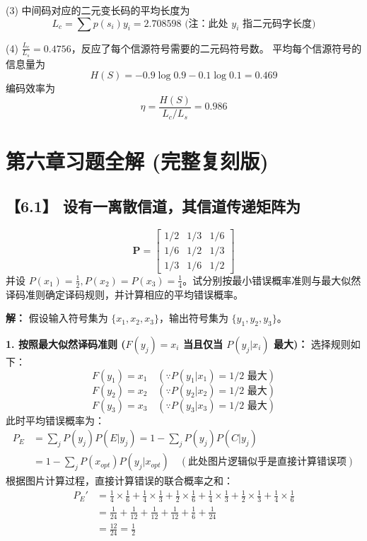 \documentclass[11pt, a4paper]{article}
\begin{document}
(3) 中间码对应的二元变长码的平均长度为
\[ L_c = \sum p(s_i) y_i = 2.708598 \text{ (注：此处 $y_i$ 指二元码字长度)} \]

(4) $\frac{L_c}{L_s} = 0.4756$，反应了每个信源符号需要的二元码符号数。
平均每个信源符号的信息量为
\[ H(S) = -0.9\log 0.9 - 0.1\log 0.1 = 0.469 \]
编码效率为
\[ \eta = \frac{H(S)}{L_c/L_s} = 0.986 \]



\section{第六章习题全解 (完整复刻版)}

\subsection*{【6.1】 设有一离散信道，其信道传递矩阵为}
\[
\mathbf{P} = \begin{bmatrix}
1/2 & 1/3 & 1/6 \\
1/6 & 1/2 & 1/3 \\
1/3 & 1/6 & 1/2
\end{bmatrix}
\]
并设 $P(x_1)=\frac{1}{2}, P(x_2)=P(x_3)=\frac{1}{4}$。试分别按最小错误概率准则与最大似然译码准则确定译码规则，并计算相应的平均错误概率。

\textbf{解：}
假设输入符号集为 $\{x_1, x_2, x_3\}$，输出符号集为 $\{y_1, y_2, y_3\}$。

\textbf{1. 按照最大似然译码准则 ($F(y_j) = x_i$ 当且仅当 $P(y_j|x_i)$ 最大)：}
选择规则如下：
\[ F(y_1) = x_1 \quad (\because P(y_1|x_1)=1/2 \text{ 最大}) \]
\[ F(y_2) = x_2 \quad (\because P(y_2|x_2)=1/2 \text{ 最大}) \]
\[ F(y_3) = x_3 \quad (\because P(y_3|x_3)=1/2 \text{ 最大}) \]
此时平均错误概率为：
\[
\begin{aligned}
P_E &= \sum_{j} P(y_j) P(E|y_j) = 1 - \sum_{j} P(y_j) P(C|y_j) \\
&= 1 - \sum_{j} P(x_{opt}) P(y_j|x_{opt}) \quad (\text{此处图片逻辑似乎是直接计算错误项})
\end{aligned}
\]
根据图片计算过程，直接计算错误的联合概率之和：
\[
\begin{aligned}
P_E' &= \frac{1}{4} \times \frac{1}{6} + \frac{1}{4} \times \frac{1}{3} + \frac{1}{2} \times \frac{1}{6} + \frac{1}{4} \times \frac{1}{3} + \frac{1}{2} \times \frac{1}{3} + \frac{1}{4} \times \frac{1}{6} \\
&= \frac{1}{24} + \frac{1}{12} + \frac{1}{12} + \frac{1}{12} + \frac{1}{6} + \frac{1}{24} \\
&= \frac{12}{24} = \frac{1}{2}
\end{aligned}
\]
\end{document}
